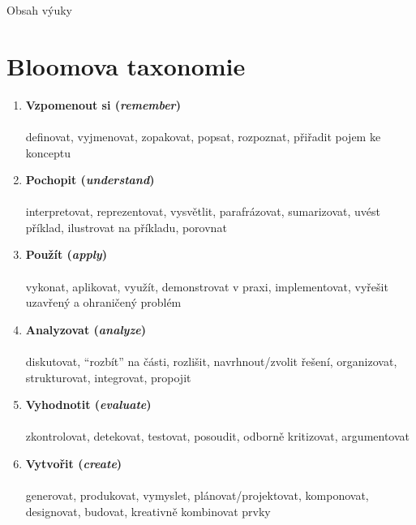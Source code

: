 Obsah výuky\\

\newpage

\chapter*{Bloomova taxonomie}
\label{bloom}
\vspace{-0.5em}
\vspace{-0.3em}

\begin{enumerate}[leftmargin=*]
\item \textbf{Vzpomenout si (\textit{remember})}\\
\\
{\small definovat, vyjmenovat, zopakovat, popsat, rozpoznat, přiřadit pojem ke konceptu}

\item \textbf{Pochopit (\textit{understand})}\\
\\
{\small interpretovat, reprezentovat, vysvětlit, parafrázovat, sumarizovat, uvést příklad, ilustrovat na příkladu, porovnat}

\item \textbf{Použít (\textit{apply})}\\
\\
{\small vykonat, aplikovat, využít, demonstrovat v praxi, implementovat, vyřešit uzavřený a ohraničený problém}

\item \textbf{Analyzovat (\textit{analyze})}\\
\\
{\small diskutovat, \enquote{rozbít} na části, rozlišit, navrhnout/zvolit řešení, organizovat, strukturovat, integrovat, propojit}

\item \textbf{Vyhodnotit (\textit{evaluate})}\\
\\
{\small zkontrolovat, detekovat, testovat, posoudit, odborně kritizovat, argumentovat}

\item \textbf{Vytvořit (\textit{create})}\\
\\
{\small generovat, produkovat, vymyslet, plánovat/projektovat, komponovat, designovat, budovat, kreativně kombinovat prvky}
\end{enumerate}

